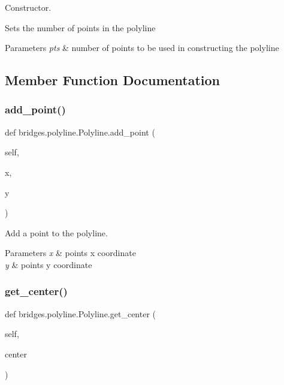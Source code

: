 Constructor. 

Sets the number of points in the polyline


\begin{DoxyParams}{Parameters}
{\em pts} & number of points to be used in constructing the polyline \\
\hline
\end{DoxyParams}


\subsection{Member Function Documentation}
\mbox{\label{classbridges_1_1polyline_1_1_polyline_a0afbd2327d8dcba63809a6be07704753}} 
\subsubsection{\texorpdfstring{add\+\_\+point()}{add\_point()}}
{\footnotesize\ttfamily def bridges.\+polyline.\+Polyline.\+add\+\_\+point (\begin{DoxyParamCaption}\item[{}]{self,  }\item[{}]{x,  }\item[{}]{y }\end{DoxyParamCaption})}



Add a point to the polyline. 


\begin{DoxyParams}{Parameters}
{\em x} & point\textquotesingle{}s x coordinate \\
\hline
{\em y} & point\textquotesingle{}s y coordinate \\
\hline
\end{DoxyParams}
\mbox{\label{classbridges_1_1polyline_1_1_polyline_a381cd78da11db3ce98fa87acd1d57449}} 
\subsubsection{\texorpdfstring{get\+\_\+center()}{get\_center()}}
{\footnotesize\ttfamily def bridges.\+polyline.\+Polyline.\+get\+\_\+center (\begin{DoxyParamCaption}\item[{}]{self,  }\item[{}]{center }\end{DoxyParamCaption})}



